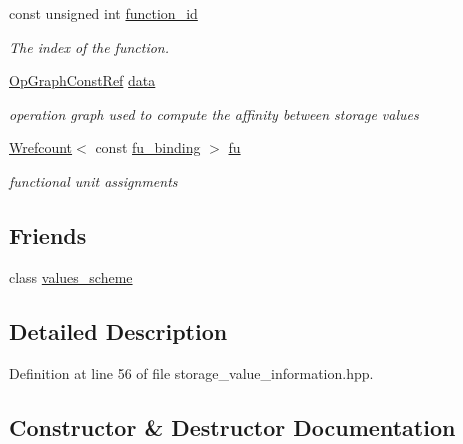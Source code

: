 \begin{DoxyCompactItemize}
const unsigned int \hyperlink{classStorageValueInformation_ad5a9397ff900616471a7fed787bdce2d}{function\+\_\+id}
\begin{DoxyCompactList}\small\item\em The index of the function. \end{DoxyCompactList}\item 
\hyperlink{op__graph_8hpp_a9a0b240622c47584bee6951a6f5de746}{Op\+Graph\+Const\+Ref} \hyperlink{classStorageValueInformation_ac59da92fcdad5a9021d8d63a7cad92ac}{data}
\begin{DoxyCompactList}\small\item\em operation graph used to compute the affinity between storage values \end{DoxyCompactList}\item 
\hyperlink{classWrefcount}{Wrefcount}$<$ const \hyperlink{classfu__binding}{fu\+\_\+binding} $>$ \hyperlink{classStorageValueInformation_a8951bbb3fc2f08b55714349c736f1714}{fu}
\begin{DoxyCompactList}\small\item\em functional unit assignments \end{DoxyCompactList}\end{DoxyCompactItemize}
\subsection*{Friends}
\begin{DoxyCompactItemize}
\item 
class \hyperlink{classStorageValueInformation_ad8261cbbbabaa93fee0cbe16ef21f3ff}{values\+\_\+scheme}
\end{DoxyCompactItemize}


\subsection{Detailed Description}


Definition at line 56 of file storage\+\_\+value\+\_\+information.\+hpp.



\subsection{Constructor \& Destructor Documentation}
\mbox{\label{classStorageValueInformation_a19c290938cd6a5392a07064fe4789d3d}} 
